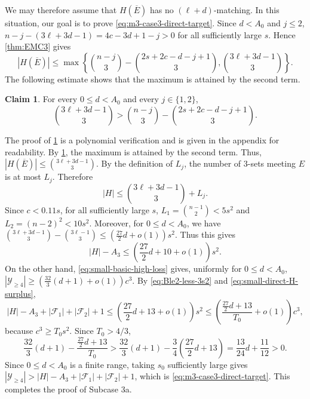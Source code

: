 \documentclass[10pt,a4paper]{article}
\numberwithin{equation}{section}
\theoremstyle{definition}
\newtheorem{claim}[claim]{Claim}
\newcommand{\F}{\mathcal F}
\newcommand{\Y}{\mathcal Y}
\begin{document}
We may therefore assume that $H(\overline E)$ has no $(\ell+d)$-matching.
In this situation, our goal is to prove \eqref{eq:m3-case3-direct-target}.
Since $d<A_0$ and $j\le2$, $n-j-(3\ell+3d-1)=4c-3d+1-j>0$ for all sufficiently large $s$.
Hence \cref{thm:EMC3} gives
\[
        |H(\overline E)|
        \le
        \max\left\{
        \binom{n-j}{3}-\binom{2s+2c-d-j+1}{3},
        \binom{3\ell+3d-1}{3}
        \right\}.
\]
The following estimate shows that the maximum is attained by the second term.
\begin{claim}\label{clm:small-shifted-second-term}
        For every $0\le d<A_0$ and every $j\in\{1,2\}$,
        \[
                \binom{3\ell+3d-1}{3}
                >
                \binom{n-j}{3}-\binom{2s+2c-d-j+1}{3}.
        \]
\end{claim}
The proof of \cref{clm:small-shifted-second-term} is a polynomial verification and is given in the appendix for readability.
By \cref{clm:small-shifted-second-term}, the maximum is attained by the second term.
Thus, $|H(\overline E)|\le \binom{3\ell+3d-1}{3}$.
By the definition of $L_j$, the number of $3$-sets meeting $E$ is at most $L_j$.
Therefore
\[
        |H|
        \le
        \binom{3\ell+3d-1}{3}+L_j.
\]
Since $c<0.11s$, for all sufficiently large $s$, $L_1=\binom{n-1}{2}<5s^2$ and $L_2=(n-2)^2<10s^2$.
Moreover, for $0\le d<A_0$, we have $\binom{3\ell+3d-1}{3}-\binom{3\ell-1}{3} \le \left(\frac{27}{2}d+o(1)\right)s^2$.
Thus this gives
\begin{equation}\label{eq:small-direct-H-surplus}
        |H|-A_3
        \le
        \left(\frac{27}{2}d+10+o(1)\right)s^2.
\end{equation}
On the other hand, \eqref{eq:small-basic-high-loss} gives, uniformly for
\(0\le d<A_0\), $|\Y_{\ge4}|
        \ge
        \left(\frac{32}{3}(d+1)+o(1)\right)c^3$.
By \eqref{eq:Ble2-less-3s2} and \eqref{eq:small-direct-H-surplus},
\[
        |H|-A_3+|\F_1|+|\F_2|+1
        \le
        \left(\frac{27}{2}d+13+o(1)\right)s^2
        \le
        \left(
        \frac{\frac{27}{2}d+13}{T_0}+o(1)
        \right)c^3,
\]
because \(c^3\ge T_0s^2\). Since \(T_0>4/3\),
\[
        \frac{32}{3}(d+1)
        -
        \frac{\frac{27}{2}d+13}{T_0}
        >
        \frac{32}{3}(d+1)
        -
        \frac34\left(\frac{27}{2}d+13\right)
        =
        \frac{13}{24}d+\frac{11}{12}>0.
\]
Since \(0\le d<A_0\) is a finite range, taking \(s_0\) sufficiently large gives $|\Y_{\ge4}|>
        |H|-A_3+|\F_1|+|\F_2|+1$, which is \eqref{eq:m3-case3-direct-target}.
This completes the proof of Subcase 3a.
\end{document}
